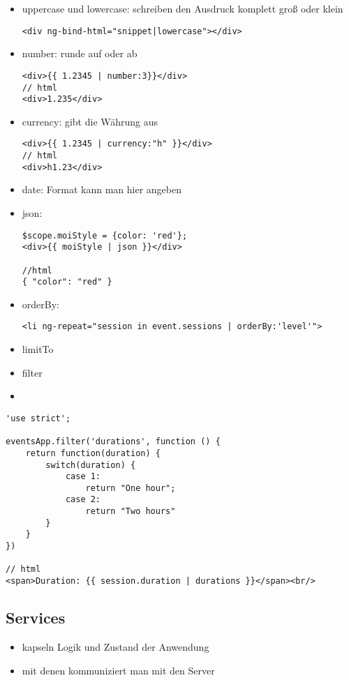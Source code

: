 
\begin{itemize}
  \item uppercase und lowercase: schreiben den Ausdruck komplett groß oder klein
    \begin{verbatim}
<div ng-bind-html="snippet|lowercase"></div>
    \end{verbatim}
  \item number: runde auf oder ab
    \begin{verbatim}
<div>{{ 1.2345 | number:3}}</div>
// html
<div>1.235</div>
    \end{verbatim}
  \item currency: gibt die Währung aus
    \begin{verbatim}
<div>{{ 1.2345 | currency:"h" }}</div>
// html
<div>h1.23</div>
    \end{verbatim}
  \item date: Format kann man hier angeben
  \item json:
    \begin{verbatim}
$scope.moiStyle = {color: 'red'};
<div>{{ moiStyle | json }}</div>

//html
{ "color": "red" }
    \end{verbatim}
  \item orderBy:
    \begin{verbatim}
<li ng-repeat="session in event.sessions | orderBy:'level'">
    \end{verbatim}
  \item limitTo
  \item filter
  \item
\end{itemize}


\begin{verbatim}
'use strict';

eventsApp.filter('durations', function () {
    return function(duration) {
        switch(duration) {
            case 1:
                return "One hour";
            case 2:
                return "Two hours"
        }
    }
})

// html
<span>Duration: {{ session.duration | durations }}</span><br/>

\end{verbatim}



\subsection{Services}
\begin{itemize}
  \item kapseln Logik und Zustand der Anwendung
  \item mit denen kommuniziert man mit den Server
\end{itemize}


